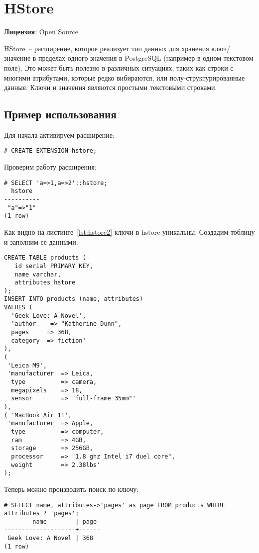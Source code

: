 \section{HStore}
\textbf{Лицензия}: Open Source

HStore~-- расширение, которое реализует тип данных для хранения ключ/значение в пределах одного значения в PostgreSQL (например в одном текстовом поле). Это может быть полезно в различных ситуациях, таких как строки с многими атрибутами, которые редко вибираются, или полу-структурированные данные. Ключи и значения являются простыми текстовыми строками.

\subsection{Пример использования}
Для начала активируем расширение:
\begin{lstlisting}[label=lst:hstore1,caption=Активация hstore]
# CREATE EXTENSION hstore;
\end{lstlisting}

Проверим работу расширения:
\begin{lstlisting}[label=lst:hstore2,caption=Проверка hstore]
# SELECT 'a=>1,a=>2'::hstore;
  hstore  
----------
 "a"=>"1"
(1 row)
\end{lstlisting}

Как видно на листинге~\ref{lst:hstore2} ключи в hstore уникальны. Создадим тоблицу и заполним её данными:

\begin{lstlisting}[label=lst:hstore3,caption=Проверка hstore]
CREATE TABLE products (
   id serial PRIMARY KEY,
   name varchar,
   attributes hstore
);   
INSERT INTO products (name, attributes)
VALUES (
  'Geek Love: A Novel',
  'author    => "Katherine Dunn",
  pages     => 368,
  category  => fiction'
),
(
 'Leica M9',
 'manufacturer  => Leica,
  type          => camera,
  megapixels    => 18,
  sensor        => "full-frame 35mm"'
),
( 'MacBook Air 11',
 'manufacturer  => Apple,
  type          => computer,
  ram           => 4GB,
  storage       => 256GB,
  processor     => "1.8 ghz Intel i7 duel core",
  weight        => 2.38lbs'
);
\end{lstlisting}

Теперь можно производить поиск по ключу:
\begin{lstlisting}[label=lst:hstore4,caption=Поиск по ключу]
# SELECT name, attributes->'pages' as page FROM products WHERE attributes ? 'pages';
        name        | page 
--------------------+------
 Geek Love: A Novel | 368
(1 row)
\end{lstlisting}

